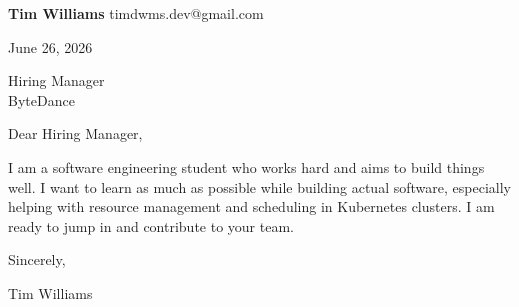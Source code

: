 \documentclass[12pt]{article}
\begin{document}
\textbf{Tim Williams} \hfill timdwms.dev@gmail.com

\vspace{1em}

June 26, 2026

\vspace{1em}

Hiring Manager \\
ByteDance

\vspace{1em}

Dear Hiring Manager,

I am a software engineering student who works hard and aims to build things well. I want to learn as much as possible while building actual software, especially helping with resource management and scheduling in Kubernetes clusters. I am ready to jump in and contribute to your team.

\vspace{1em}

Sincerely,

\vspace{2em}

Tim Williams
\end{document}
